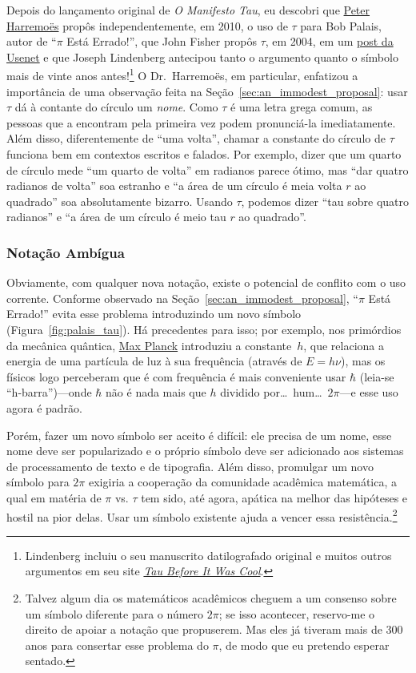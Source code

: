 Depois do lançamento original de \emph{O Manifesto Tau}, eu descobri que \href{http://www.harremoes.dk/Peter/}{Peter Harremo\"{e}s} propôs independentemente, em 2010, o uso de $\tau$ para Bob Palais, autor de ``$\pi$ Está Errado!'', que John Fisher propôs $\tau$, em 2004, em um \href{https://groups.google.com/forum/#!msg/sci.math/c-DHmJHSA0A/sLCoOtHB1UAJ}{post da Usenet} e que Joseph Lindenberg antecipou tanto o argumento quanto o símbolo mais de vinte anos antes!\footnote{Lindenberg incluiu o seu manuscrito datilografado original e muitos outros argumentos em seu site \href{https://sites.google.com/site/taubeforeitwascool/}{\emph{Tau Before It Was Cool}}.} O Dr.~Harremo\"{e}s, em particular, enfatizou a importância de uma observação feita na Seção~\ref{sec:an_immodest_proposal}: usar $\tau$ dá à contante do círculo um \emph{nome}. Como $\tau$ é uma letra grega comum, as pessoas que a encontram pela primeira vez podem pronunciá-la imediatamente. Além disso, diferentemente de ``uma volta'', chamar a constante do círculo de $\tau$ funciona bem em contextos escritos e falados. Por exemplo, dizer que um quarto de círculo mede ``um quarto de volta'' em radianos parece ótimo, mas ``dar quatro radianos de volta'' soa estranho e ``a área de um círculo é meia volta $r$ ao quadrado'' soa absolutamente bizarro. Usando $\tau$, podemos dizer ``tau sobre quatro radianos'' e ``a área de um círculo é meio tau $r$ ao quadrado''.

    \subsubsection{Notação Ambígua} %
    \label{sec:ambiguous_notation}


Obviamente, com qualquer nova notação, existe o potencial de conflito com o uso corrente. Conforme observado na Seção~\ref{sec:an_immodest_proposal}, ``$\pi$ Está Errado!'' evita esse problema introduzindo um novo símbolo (Figura~\ref{fig:palais_tau}). Há precedentes para isso; por exemplo, nos primórdios da mecânica quântica, \href{https://pt.wikipedia.org/wiki/Max_Planck}{Max Planck} introduziu a constante~$h$, que relaciona a energia de uma partícula de luz à sua frequência (através de $E = h\nu$), mas os físicos logo perceberam que é com frequência é mais conveniente usar $\hbar$ (leia-se ``h-barra'')---onde $\hbar$ não é nada mais que $h$ dividido por\ldots\ hum\ldots\ $2\pi$---e esse uso agora é padrão.

Porém, fazer um novo símbolo ser aceito é difícil: ele precisa de um nome, esse nome deve ser popularizado e o próprio símbolo deve ser adicionado aos sistemas de processamento de texto e de tipografia. Além disso, promulgar um novo símbolo para $2\pi$ exigiria a cooperação da comunidade acadêmica matemática, a qual em matéria de $\pi$ vs. $\tau$ tem sido, até agora, apática na melhor das hipóteses e hostil na pior delas. Usar um símbolo existente ajuda a vencer essa resistência.\footnote{Talvez algum dia os matemáticos acadêmicos cheguem a um consenso sobre um símbolo diferente para o número $2\pi$; se isso acontecer, reservo-me o direito de apoiar a notação que propuserem. Mas eles já tiveram mais de 300 anos para consertar esse problema do $\pi$, de modo que eu pretendo esperar sentado.}

